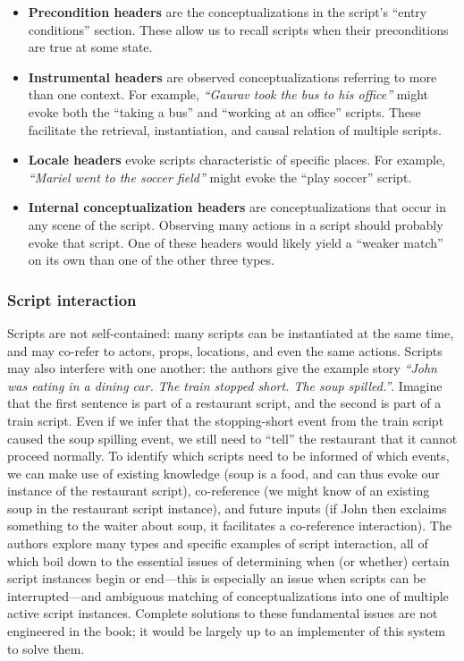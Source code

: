 \begin{itemize}
    \item \textbf{Precondition headers} are the conceptualizations in the script's ``entry conditions'' section. These allow us to recall scripts when their preconditions are true at some state.%
    
    \item \textbf{Instrumental headers} are observed conceptualizations referring to more than one context. For example, \textit{``Gaurav took the bus to his office''} might evoke both the ``taking a bus'' and ``working at an office'' scripts. These facilitate the retrieval, instantiation, and causal relation of multiple scripts.
    
    \item \textbf{Locale headers} evoke scripts characteristic of specific places. For example, \textit{``Mariel went to the soccer field''} might evoke the ``play soccer'' script.
    
    \item \textbf{Internal conceptualization headers} are conceptualizations that occur in any scene of the script. Observing many actions in a script should probably evoke that script. One of these headers would likely yield a ``weaker match'' on its own than one of the other three types.
\end{itemize}
\fi


\subsubsection{Script interaction}

Scripts are not self-contained: many scripts can be instantiated at the same time, and may co-refer to actors, props, locations, and even the same actions. Scripts may also interfere with one another: the authors give the example story \textit{``John was eating in a dining car. The train stopped short. The soup spilled.''}. Imagine that the first sentence is part of a restaurant script, and the second is part of a train script. Even if we infer that the stopping-short event from the train script caused the soup spilling event, we still need to ``tell'' the restaurant that it cannot proceed normally. To identify which scripts need to be informed of which events, we can make use of existing knowledge (soup is a food, and can thus evoke our instance of the restaurant script), co-reference (we might know of an existing soup in the restaurant script instance), and future inputs (if John then exclaims something to the waiter about soup, it facilitates a co-reference interaction). The authors explore many types and specific examples of script interaction, all of which boil down to the essential issues of determining when (or whether) certain script instances begin or end---this is especially an issue when scripts can be interrupted---and ambiguous matching of conceptualizations into one of multiple active script instances. Complete solutions to these fundamental issues are not engineered in the book; it would be largely up to an implementer of this system to solve them.


